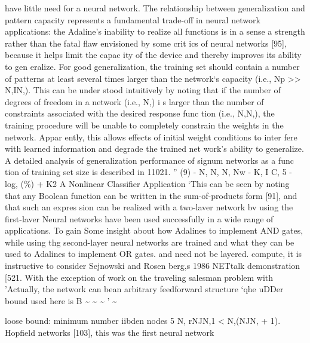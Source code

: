 \documentclass[11pt,a4paper,twocolumn]{article}
\begin{document}
have little need for a neural network. The relationship 
between generalization and pattern capacity represents a 
fundamental trade-off in neural network applications: 
the Adaline’s inability to realize all functions is in a sense 
a strength rather than the fatal flaw envisioned by some crit
ics of neural networks [95], because it helps limit the capac
ity of the device and thereby improves its ability to gen
eralize. 
For good generalization, the training set should contain 
a number of patterns at least several times larger than the 
network‘s capacity (i.e., Np >> N,IN,). 
This can be under
stood intuitively by noting that if the number of degrees of 
freedom in a network (i.e., N,) 
i s  larger than the number 
of constraints associated with the desired response func
tion (i.e., N,N,), 
the training procedure will be unable to 
completely constrain the weights in the network. Appar
ently, this allows effects of initial weight conditions to inter
fere with learned information and degrade the trained net
work’s ability to generalize. A detailed analysis of 
generalization performance of signum networks as a func
tion of training set size is described in 11021. 
” 
(9) 
- 
N, 
N, 
N, 
Nw - K, I 
C, 5 - 
log, (\%) + K2 
A Nonlinear Classifier Application 
‘This can be seen by noting that any Boolean function can be 
written in the sum-of-products form [91], and that such an expres
sion can be realized with a two-laver network bv using the first-laver 
Neural networks have been used successfully in a wide 
range of applications. To gain Some insight about how 
Adalines to implement AND gates, while using thg second-layer 
neural networks are trained and what they can be used to 
Adalines to implement OR gates. 
and need not be layered. 
compute, it is instructive to consider Sejnowski and Rosen
berg,s 1986 NETtalk demonstration 
[521. With the 
exception of work on the traveling salesman problem with 
’Actually, the network can bean arbitrary feedforward structure 
‘qhe uDDer bound used here is B
\~{}
\~{}
\~{}
’
\~{}

loose bound: minimum 
number iibden nodes 5 N, rNJN,1 < N,(NJN, + 1). 
Hopfield networks [103], this was the first neural network 






\newpage

\end{document}
